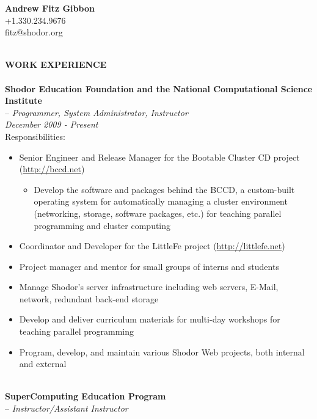 \documentclass[10pt]{article}
\begin{document}
\begin{center}
\textbf{Andrew Fitz Gibbon}~\\
+1.330.234.9676~\\
fitz@shodor.org~\\
\end{center}
~\\
\textbf{WORK EXPERIENCE}~\\
~\\
\indent\textbf{Shodor Education Foundation and the National Computational Science Institute}~\\
\indent \indent -- \emph{Programmer, System Administrator, Instructor}~\\
\indent\textit{December 2009 - Present}~\\
\indent Responsibilities:
\begin{itemize}
  \addtolength{\itemsep}{-2mm}
		\item \indent Senior Engineer and Release Manager for the Bootable Cluster CD project (\url{http://bccd.net})
		\vspace{-2mm}
		\begin{itemize}
			\addtolength{\itemsep}{-2mm}
			\item Develop the software and packages behind the BCCD, a custom-built operating system for automatically managing a cluster environment (networking, storage, software packages, etc.) for teaching parallel programming and cluster computing
		\end{itemize}
		\vspace{-2mm}
    \item \indent Coordinator and Developer for the LittleFe project (\url{http://littlefe.net})
		\item \indent Project manager and mentor for small groups of interns and students
		\item \indent Manage Shodor's server infrastructure including web servers, E-Mail, network, redundant back-end storage
		\item \indent Develop and deliver curriculum materials for multi-day workshops for teaching parallel programming
		\item \indent Program, develop, and maintain various Shodor Web projects, both internal and external
\end{itemize}
~\\
\indent\textbf{SuperComputing Education Program}~\\
\indent \indent -- \emph{Instructor/Assistant Instructor}~\\
\end{document}
